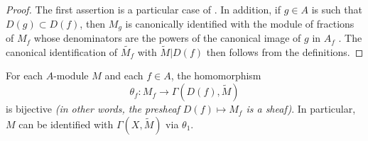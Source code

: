 \begin{proof}
The first assertion is a particular case of .
In addition, if $g\in A$ is such that $D(g)\subset D(f)$, then $M_g$ is canonically identified with the module of fractions of $M_f$ whose denominators are the powers of the canonical image of $g$ in $A_f$ .
The canonical identification of $\widetilde{M_f}$ with $\widetilde{M}|D(f)$ then follows from the definitions.
\end{proof}

\begin{theorem}[1.3.7]
\label{I.1.3.7}
For each $A$-module $M$ and each $f\in A$, the homomorphism
\[
  \theta_f:M_f\to\Gamma(D(f),\widetilde{M})
\]
is bijective \emph{(in other words, the presheaf $D(f)\mapsto M_f$ is a \emph{sheaf})}.
In particular, $M$ can be identified with $\Gamma(X,\widetilde{M})$ via $\theta_1$.
\end{theorem}


